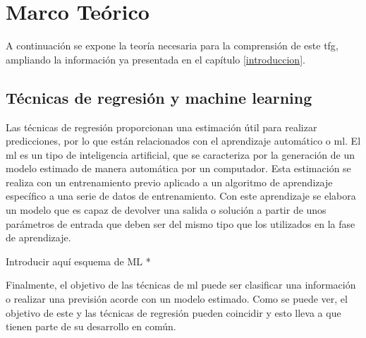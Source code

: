 
\chapter{Marco Teórico}
\label{marcoteorico}
\par A continuación se expone la teoría necesaria para la comprensión de este \gls{tfg}, ampliando la información ya presentada en el capítulo \ref{introduccion}.
\section{Técnicas de regresión y machine learning}


\par Las técnicas de regresión proporcionan una estimación útil para realizar predicciones, por lo que están relacionados con el aprendizaje automático o \gls{ml}. El \gls{ml} es un tipo de inteligencia artificial, que se caracteriza por la generación de un modelo estimado de manera automática por un computador. Esta estimación se realiza con un entrenamiento previo aplicado a un algoritmo de aprendizaje específico a una serie de datos de entrenamiento. Con este aprendizaje se elabora un modelo que es capaz de devolver una salida o solución a partir de unos parámetros de entrada que deben ser del mismo tipo que los utilizados en la fase de aprendizaje. 
\\
\par * Introducir aquí esquema de ML *
\\
\par Finalmente, el objetivo de las técnicas de \gls{ml} puede ser clasificar una información o realizar una previsión acorde con un modelo estimado. Como se puede ver, el objetivo de este y las técnicas de regresión pueden coincidir y esto lleva a que tienen parte de su desarrollo en común. 

